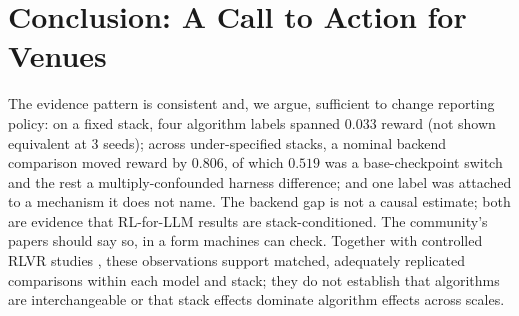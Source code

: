 \section{Conclusion: A Call to Action for Venues}
\label{sec:p5-conclusion}
The evidence pattern is consistent and, we argue, sufficient to change reporting
policy: on a fixed stack, four algorithm labels spanned $0.033$ reward (not
shown equivalent at 3 seeds); across under-specified stacks, a nominal backend
comparison moved reward by $0.806$, of which $0.519$ was a base-checkpoint
switch and the rest a multiply-confounded harness difference; and one label
was attached to a mechanism it does not name. The backend gap is not a causal
estimate; both are evidence that RL-for-LLM results
are stack-conditioned. The community's papers should say so, in a form
machines can check. Together with controlled RLVR studies
\citep{hochlehnert2025sober, li2026oxrl, liu2025tricks}, these observations
support matched, adequately replicated comparisons within each model and
stack; they do not establish that algorithms are interchangeable or that
stack effects dominate algorithm effects across scales.

